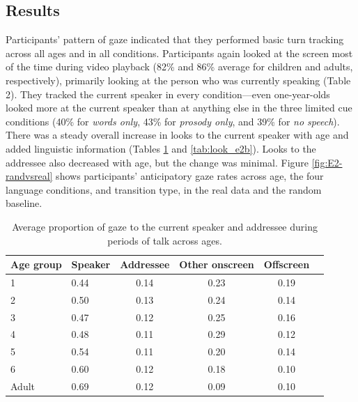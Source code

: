 \documentclass[authoryear, 12pt]{elsarticle}
\begin{document}
\subsection{Results}
\label{sec:results2}

Participants' pattern of gaze indicated that they performed basic turn tracking across all ages and in all conditions. Participants again looked at the screen most of the time during video playback (82\% and 86\% average for children and adults, respectively), primarily looking at the person who was currently speaking (Table 2). They tracked the current speaker in every condition---even one-year-olds looked more at the current speaker than at anything else in the three limited cue conditions (40\% for \textit{words only}, 43\% for \textit{prosody only}, and 39\% for \textit{no speech}). There was a steady overall increase in looks to the current speaker with age and added linguistic information (Tables \ref{tab:look_e2} and \ref{tab:look_e2b}). Looks to the addressee also decreased with age, but the change was minimal. Figure \ref{fig:E2-randvsreal} shows participants' anticipatory gaze rates across age, the four language conditions, and transition type, in the real data and the random baseline.

\begin{table}[h]
\begin{center}
  \begin{tabular}{llcccc}
    \hline
    Age group & Speaker & Addressee & Other onscreen & Offscreen\\ 
    \hline
    1 & 0.44 & 0.14 & 0.23 & 0.19 \\ 
    2 & 0.50 & 0.13 & 0.24 & 0.14 \\ 
    3 & 0.47 & 0.12 & 0.25 & 0.16 \\ 
    4 & 0.48 & 0.11 & 0.29 & 0.12 \\ 
    5 & 0.54 & 0.11 & 0.20 & 0.14 \\ 
    6 & 0.60 & 0.12 & 0.18 & 0.10 \\
    Adult & 0.69 & 0.12 & 0.09 & 0.10 \\
    \hline
  \end{tabular}
\end{center}
  \caption{Average proportion of gaze to the current speaker and addressee during periods of talk across ages.}
\label{tab:look_e2}
\end{table}
\end{document}
